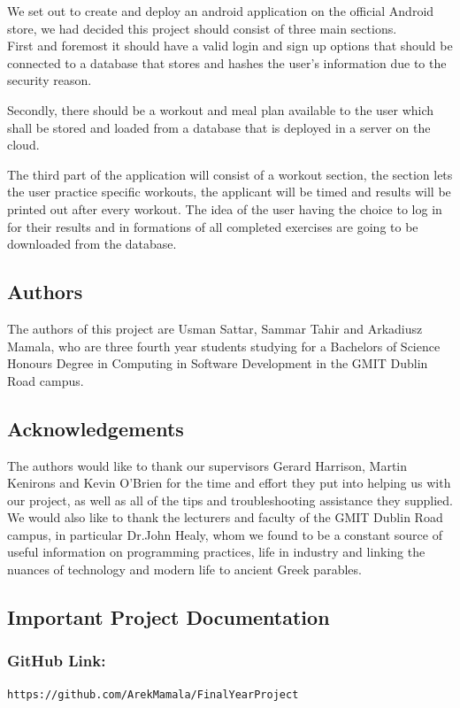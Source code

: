 \documentclass[a4paper,12pt]{report}
\begin{document}
We set out to create and deploy an android application on the official Android store, we had decided this project should consist of three main sections.\\

First and foremost it should have a valid login and sign up options that should be connected to a database that stores and hashes the user's information due to the security reason. 

Secondly, there should be a workout and meal plan available to the user which shall be stored and loaded from a database that is deployed in a server on the cloud.

The third part of the application will consist of a workout section, the section lets the user practice specific workouts, the applicant will be timed and results will be printed out after every workout. The idea of the user having the choice to log in for their results and in formations of all completed exercises are going to be downloaded from the database.

\subsection*{Authors}
The authors of this project are Usman Sattar, Sammar Tahir and Arkadiusz Mamala, who are three fourth year students studying for a Bachelors of Science Honours Degree in Computing in Software Development in the GMIT Dublin Road campus.
    
\subsection*{Acknowledgements}
The authors would like to thank our supervisors Gerard Harrison, Martin Kenirons and Kevin O’Brien for the time and effort they put into helping us with our project, as well as all of the tips and troubleshooting assistance they supplied.\\

We would also like to thank the lecturers and faculty of the GMIT Dublin Road campus, in particular Dr.John Healy, whom we found to be a constant source of useful information on programming practices, life in industry and linking the nuances of technology and modern life to ancient Greek parables.

\subsection*{Important Project Documentation}
\subsubsection{GitHub Link:}\begin{lstlisting}
https://github.com/ArekMamala/FinalYearProject
\end{lstlisting}
\end{document}
